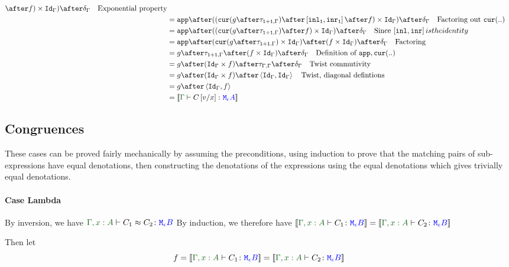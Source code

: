 {\begin{align}
{        }\after f)\times \idg)\after\diag{\G}\qt{Exponential property}\\
        & = \app\after((\cur{g\after\twist{\1+\1}{\G}}\after\fld{
            \inl_\1
        }{
            \inr_\1
        }\after f)\times \idg)\after\diag{\G}\qt{Factoring out $\cur{..}$}\\
        & = \app\after((\cur{g\after\twist{\1+\1}{\G}}\after f)\times \idg)\after\diag{\G}\qt{Since $\fld{\inl}{\inr} is the identity$}\\
        & = \app\after(\cur{g\after\twist{\1+\1}{\G}}\times \idg)\after (f\times \idg)\after\diag{\G}\qt{Factoring}\\
       & = g\after\twist{\1+\1}{\G} \after (f\times \idg)\after\diag{\G} \qt{Definition of $\app,\cur{..}$}\\
       & = g\after(\idg\times f)\after \twist{\G}{\G} \after\diag{\G} \qt{Twist commutivity}\\
       & = g\after(\idg\times f) \after\pr{\idg}{\idg} \qt{Twist, diagonal defintions} \\
       & = g\after\pr{\idg}{f} \\
       & = \deno{\gtyperelation{C\ssub{x}{v}}{\mea}} \\
    \end{align}






\subsection{Congruences}
These cases can be proved fairly mechanically by assuming the preconditions, using induction to prove that the matching pairs of sub-expressions have equal denotations, then constructing the denotations of the expressions using the equal denotations which gives trivially equal denotations.

\paragraph{Case Lambda}
    By inversion, we have $\berelation{\gax}{C_1}{C_2}{\meb}$
    By induction, we therefore have $\deno{\typerelation{\gax}{C_1}{\meb}} = \deno{\typerelation{\gax}{C_2}{\meb}}$

    Then let
    \begin{equation}
        f = \deno{\typerelation{\gax}{C_1}{\meb}} = \deno{\typerelation{\gax}{C_2}{\meb}}
    \end{equation}

}

